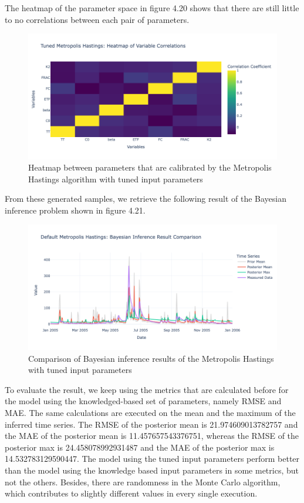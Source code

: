 The heatmap of the parameter space in figure 4.20 shows that there are still little to no correlations between each pair of parameters.
\begin{figure}
    \centering
    \includegraphics[width=1\textwidth]{figures/basic_mh/tuned_mh/tuned_mh_heatmap.png}
    \captionsetup{width=.8\textwidth}
    \caption{Heatmap between parameters that are calibrated by the Metropolis Hastings algorithm with tuned input parameters}
    \label{fig:enter-label}
\end{figure}

From these generated samples, we retrieve the following result of the Bayesian inference problem shown in figure 4.21.
\begin{figure}
    \centering
    \includegraphics[width=1\textwidth] {figures/basic_mh/tuned_mh/tuned_mh_bayes.png}
    \captionsetup{width=.8\textwidth}
    \caption{Comparison of Bayesian inference results of the Metropolis Hastings with tuned input parameters}
    \label{fig:enter-label}
\end{figure}

To evaluate the result, we keep using the metrics that are calculated before for the model using the knowledged-based set of parameters, namely RMSE and MAE. The same calculations are executed on the mean and the maximum of the inferred time series. The RMSE of the posterior mean is 21.974609013782757 and the MAE of the posterior mean is 11.457657543376751, whereas the RMSE of the posterior max is 24.458078992931487 and the MAE of the posterior max is 14.532783129590447. The model using the tuned input parameters perform better than the model using the knowledge based input parameters in some metrics, but not the others. Besides, there are randomness in the Monte Carlo algorithm,\cite{monte_carlo_randomness} which contributes to slightly different values in every single execution.

